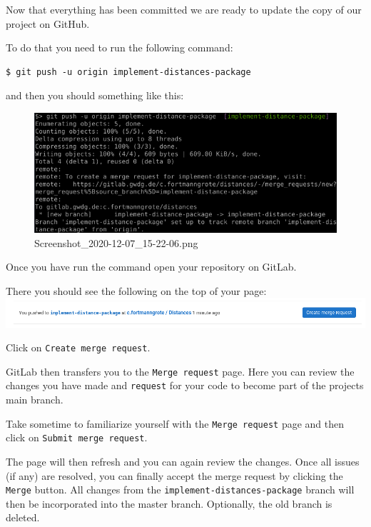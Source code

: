 \documentclass[11pt]{article}
\begin{document}
    Now that everything has been committed we are ready to update the copy
of our project on GitHub.

To do that you need to run the following command:

\begin{verbatim}
$ git push -u origin implement-distances-package
\end{verbatim}

and then you should something like this:

\begin{figure}
\centering
\includegraphics{static/push.png}
\caption{Screenshot\_2020-12-07\_15-22-06.png}
\end{figure}

    Once you have run the command open your repository on GitLab.

There you should see the following on the top of your page:
\includegraphics{static/notification_git_lab.png}

Click on \texttt{Create\ merge\ request}.

GitLab then transfers you to the \texttt{Merge\ request} page. Here you
can review the changes you have made and \texttt{request} for your code
to become part of the projects main branch.

Take sometime to familiarize yourself with the \texttt{Merge\ request}
page and then click on \texttt{Submit\ merge\ request}.

The page will then refresh and you can again review the changes. Once
all issues (if any) are resolved, you can finally accept the merge
request by clicking the \texttt{Merge} button. All changes from the
\texttt{implement-distances-package} branch will then be incorporated
into the master branch. Optionally, the old branch is deleted.
\end{document}
